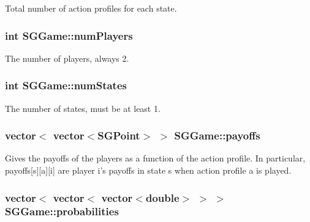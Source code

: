 Total number of action profiles for each state. \hypertarget{classSGGame_a6f02e3f92db6a3c5d2d9076dcb7b6d61}{
\subsubsection[{num\-Players}]{\setlength{\rightskip}{0pt plus 5cm}int S\-G\-Game\-::num\-Players\hspace{0.3cm}{\ttfamily [private]}}}\label{classSGGame_a6f02e3f92db6a3c5d2d9076dcb7b6d61}
The number of players, always 2. \hypertarget{classSGGame_ae7b105b2fe9ee277d38e518223dd0482}{
\subsubsection[{num\-States}]{\setlength{\rightskip}{0pt plus 5cm}int S\-G\-Game\-::num\-States\hspace{0.3cm}{\ttfamily [private]}}}\label{classSGGame_ae7b105b2fe9ee277d38e518223dd0482}
The number of states, must be at least 1. \hypertarget{classSGGame_aad28dd39c6359e772286a938a948634c}{
\subsubsection[{payoffs}]{\setlength{\rightskip}{0pt plus 5cm}vector$<$ vector$<${\bf S\-G\-Point}$>$ $>$ S\-G\-Game\-::payoffs\hspace{0.3cm}{\ttfamily [private]}}}\label{classSGGame_aad28dd39c6359e772286a938a948634c}
Gives the payoffs of the players as a function of the action profile. In particular, payoffs\mbox{[}s\mbox{]}\mbox{[}a\mbox{]}\mbox{[}i\mbox{]} are player i's payoffs in state s when action profile a is played. \hypertarget{classSGGame_a167a281b11d524cb4a11dbaff3e9de68}{
\subsubsection[{probabilities}]{\setlength{\rightskip}{0pt plus 5cm}vector$<$ vector$<$ vector$<$double$>$ $>$ $>$ S\-G\-Game\-::probabilities\hspace{0.3cm}{\ttfamily [private]}}}\label{classSGGame_a167a281b11d524cb4a11dbaff3e9de68}
